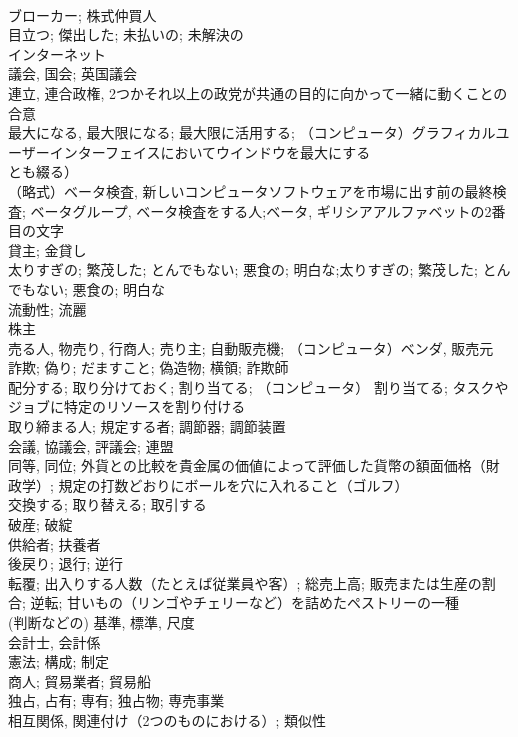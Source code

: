 \documentclass[8pt]{extreport}
\begin{document}
\begin{CJK}{UTF8}{min}
\\	ブローカー; 株式仲買人	
\\	目立つ; 傑出した; 未払いの; 未解決の	
\\	インターネット	
\\	議会, 国会; 英国議会	
\\	連立, 連合政権, 2つかそれ以上の政党が共通の目的に向かって一緒に動くことの合意	
\\	最大になる, 最大限になる; 最大限に活用する; （コンピュータ）グラフィカルユーザーインターフェイスにおいてウインドウを最大にする
\\	とも綴る）	
\\	（略式）ベータ検査, 新しいコンピュータソフトウェアを市場に出す前の最終検査; ベータグループ, ベータ検査をする人;ベータ, ギリシアアルファベットの2番目の文字	
\\	貸主; 金貸し	
\\	太りすぎの; 繁茂した; とんでもない; 悪食の; 明白な;太りすぎの; 繁茂した; とんでもない; 悪食の; 明白な	
\\	流動性; 流麗	
\\	株主	
\\	売る人, 物売り, 行商人; 売り主; 自動販売機; （コンピュータ）ベンダ, 販売元	
\\	詐欺; 偽り; だますこと; 偽造物; 横領; 詐欺師	
\\	配分する; 取り分けておく; 割り当てる; （コンピュータ） 割り当てる; タスクやジョブに特定のリソースを割り付ける	
\\	取り締まる人; 規定する者; 調節器; 調節装置	
\\	会議, 協議会, 評議会; 連盟	
\\	同等, 同位; 外貨との比較を貴金属の価値によって評価した貨幣の額面価格（財政学）; 規定の打数どおりにボールを穴に入れること（ゴルフ）	
\\	交換する; 取り替える; 取引する	
\\	破産; 破綻	
\\	供給者; 扶養者	
\\	後戻り; 退行; 逆行	
\\	転覆; 出入りする人数（たとえば従業員や客）; 総売上高; 販売または生産の割合; 逆転; 甘いもの（リンゴやチェリーなど）を詰めたペストリーの一種	
\\	(判断などの) 基準, 標準, 尺度	
\\	会計士, 会計係	
\\	憲法; 構成; 制定	
\\	商人; 貿易業者; 貿易船	
\\	独占, 占有; 専有; 独占物; 専売事業	
\\	相互関係, 関連付け（2つのものにおける）; 類似性	

\end{CJK}
\end{document}
